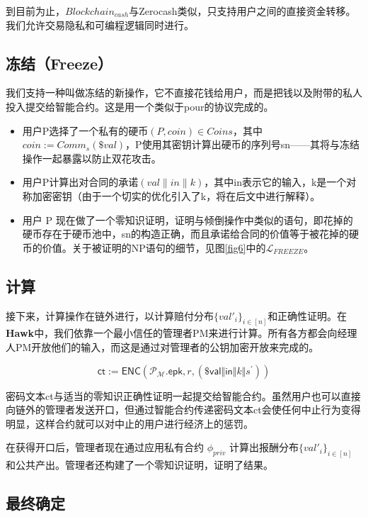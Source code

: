 \documentclass{xduugtrans}
\begin{document}
到目前为止，$Blockchain_{cash}$与Zerocash\cite{ref11}类似，只支持用户之间的直接资金转移。我们允许交易隐私和可编程逻辑同时进行。

\subsection{冻结（Freeze）}

我们支持一种叫做冻结的新操作，它不直接花钱给用户，而是把钱以及附带的私人投入提交给智能合约。这是用一个类似于pour的协议完成的。

\begin{itemize}
    \item 用户P选择了一个私有的硬币$(P, coin) \in Coins$，其中$coin := Comm_{s}(\$val)$，P使用其密钥计算出硬币的序列号sn——其将与冻结操作一起暴露以防止双花攻击。
    \item 用户P计算出对合同的承诺$(val \parallel in \parallel k)$，其中in表示它的输入，k是一个对称加密密钥（由于一个切实的优化引入了k，将在后文中进行解释）。
    \item 用户 P 现在做了一个零知识证明，证明与倾倒操作中类似的语句，即花掉的硬币存在于硬币池中，sn的构造正确，而且承诺给合同的价值等于被花掉的硬币的价值。关于被证明的NP语句的细节，见图\ref{fig6}中的$\mathcal{L}_{FREEZE}$。
\end{itemize}

\subsection{计算}

接下来，计算操作在链外进行，以计算赔付分布$\{val′_{i}\}_{i \in [n]}$和正确性证明。在\textbf{Hawk}中，我们依靠一个最小信任的管理者PM来进行计算。所有各方都会向经理人PM开放他们的输入，而这是通过对管理者的公钥加密开放来完成的。

\begin{equation}
     \mathsf{ct}:=\mathsf{ENC}(\mathcal{P}_{\mathcal{M}}.\mathsf{epk},r,(\$\mathsf{val}\Vert\mathsf{in}\Vert k\Vert s^{\prime}))
\end{equation}

密码文本ct与适当的零知识正确性证明一起提交给智能合约。虽然用户也可以直接向链外的管理者发送开口，但通过智能合约传递密码文本ct会使任何中止行为变得明显，这样合约就可以对中止的用户进行经济上的惩罚。

在获得开口后，管理者现在通过应用私有合约 $\phi _{priv}$ 计算出报酬分布$\{val′_{i}\}_{i \in [n]}$和公共产出。管理者还构建了一个零知识证明，证明了结果。

\subsection{最终确定}
\end{document}

